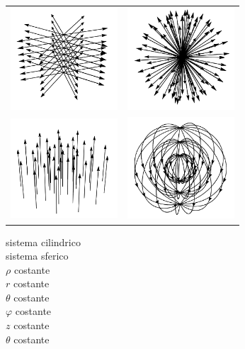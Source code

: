 \documentclass[10pt,landscape]{article}
\begin{document}
\begin{multicols*}{2}
\begin{tabular}{c c}
\includegraphics[width=4cm]{c2cyl}&\includegraphics[width=4cm]{c2sph}\\
\includegraphics[width=4cm]{c3cyl}&\includegraphics[width=4cm]{c3sph}
\end{tabular}
\vfill\null\columnbreak
sistema cilindrico\\sistema sferico\\
$\rho$ costante\\$r$ costante\\
$\theta$ costante\\$\varphi$ costante\\
$z$ costante\\$\theta$ costante



\end{multicols*}
\end{document}
